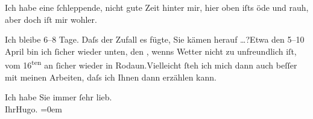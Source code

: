 \pstart
           Ich habe eine{ }ſchleppende, nicht gute Zeit hinter mir, hier oben iſts öde und rauh,
               aber doch iſt mir wohler.\pend
           
\pstart
           Ich bleibe \label{K_L02167-2v}\label{K_L02167-2} 6–8 Tage. Daſs
               der Zufall es fügte, Sie kämen herauf {\dots}?\hspace*{1.5em}Etwa den 5–10 April bin ich{ }ſicher wieder unten, den \label{K_L02167-3v}\label{K_L02167-3},
               wenns Wetter nicht zu unfreundlich iſt, vom 16\textsuperscript{ten} an{ }ſicher wieder in Rodaun.\hspace*{1.5em}Vielleicht{ }ſteh ich mich dann auch beſſer  mit meinen Arbeiten, daſs ich Ihnen dann erzählen
               kann.\pend
           
\pstart
           Ich habe Sie immer{ }ſehr lieb.{\\[\baselineskip]}Ihr\spacefill\mbox{Hugo.}\pend
           \leftskip=0em{}\endnumbering{}  \newcommand{\dateiname}{L02167}\newcommand{\titel}{Hugo von Hofmannsthal an Arthur Schnitzler, 27. 3. [1914]}\newcommand{\editorInnen}{Martin Anton Müller und Gerd-Hermann Susen}
